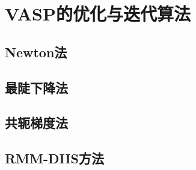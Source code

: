 \chapter{\rm{VASP}的优化与迭代算法}
\section{\rm{Newton}法}

\section{最陡下降法}
\section{共轭梯度法}

\section{\rm{RMM-DIIS}方法}
